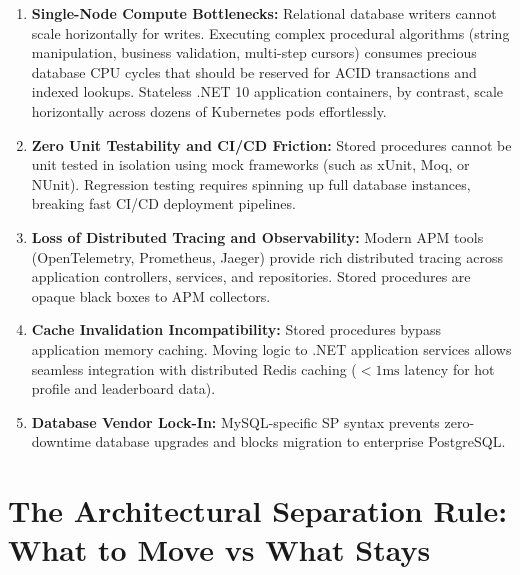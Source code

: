 \begin{enumerate}
    \item \textbf{Single-Node Compute Bottlenecks:} Relational database writers cannot scale horizontally for writes. Executing complex procedural algorithms (string manipulation, business validation, multi-step cursors) consumes precious database CPU cycles that should be reserved for ACID transactions and indexed lookups. Stateless .NET 10 application containers, by contrast, scale horizontally across dozens of Kubernetes pods effortlessly.
    \item \textbf{Zero Unit Testability and CI/CD Friction:} Stored procedures cannot be unit tested in isolation using mock frameworks (such as xUnit, Moq, or NUnit). Regression testing requires spinning up full database instances, breaking fast CI/CD deployment pipelines.
    \item \textbf{Loss of Distributed Tracing and Observability:} Modern APM tools (OpenTelemetry, Prometheus, Jaeger) provide rich distributed tracing across application controllers, services, and repositories. Stored procedures are opaque black boxes to APM collectors.
    \item \textbf{Cache Invalidation Incompatibility:} Stored procedures bypass application memory caching. Moving logic to .NET application services allows seamless integration with distributed Redis caching ($< 1\text{ms}$ latency for hot profile and leaderboard data).
    \item \textbf{Database Vendor Lock-In:} MySQL-specific SP syntax prevents zero-downtime database upgrades and blocks migration to enterprise PostgreSQL.
\end{enumerate}

\section{The Architectural Separation Rule: What to Move vs What Stays}

